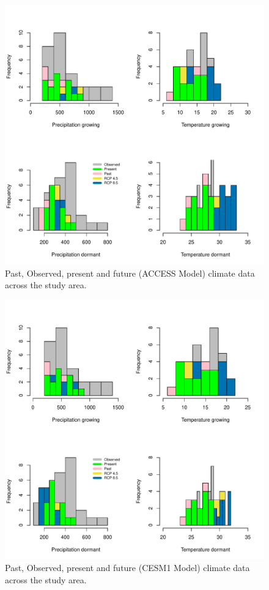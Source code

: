 \documentclass[12pt]{article}
\begin{document}
\begin{figure}[H]
		\centering
		\includegraphics[width=0.99\linewidth]{Figures/ACCESS.pdf}
		\caption{Past, Observed, present and future (ACCESS Model) climate data across the study area.}
		\label{Sup:projectionACCESS}
\end{figure}

\begin{figure}[H]
		\centering
		\includegraphics[width=0.99\linewidth]{Figures/CESM1.pdf}
		\caption{Past, Observed, present and future (CESM1 Model) climate data across the study area.}
		\label{Sup:projectionCESM1}
\end{figure}
\end{document}
